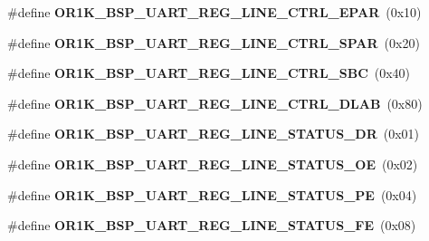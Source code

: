 \begin{DoxyCompactItemize}
\#define {\bfseries O\+R1\+K\+\_\+\+B\+S\+P\+\_\+\+U\+A\+R\+T\+\_\+\+R\+E\+G\+\_\+\+L\+I\+N\+E\+\_\+\+C\+T\+R\+L\+\_\+\+E\+P\+AR}~(0x10)
\item 
\mbox{\label{group__generic__or1k__reg_ga014665df73fa3c3c116e0972a6cc53fc}} 
\#define {\bfseries O\+R1\+K\+\_\+\+B\+S\+P\+\_\+\+U\+A\+R\+T\+\_\+\+R\+E\+G\+\_\+\+L\+I\+N\+E\+\_\+\+C\+T\+R\+L\+\_\+\+S\+P\+AR}~(0x20)
\item 
\mbox{\label{group__generic__or1k__reg_gae7a01f69b0ed842372858b2d42b120e1}} 
\#define {\bfseries O\+R1\+K\+\_\+\+B\+S\+P\+\_\+\+U\+A\+R\+T\+\_\+\+R\+E\+G\+\_\+\+L\+I\+N\+E\+\_\+\+C\+T\+R\+L\+\_\+\+S\+BC}~(0x40)
\item 
\mbox{\label{group__generic__or1k__reg_ga02b271c431301d49903aa676645ee95c}} 
\#define {\bfseries O\+R1\+K\+\_\+\+B\+S\+P\+\_\+\+U\+A\+R\+T\+\_\+\+R\+E\+G\+\_\+\+L\+I\+N\+E\+\_\+\+C\+T\+R\+L\+\_\+\+D\+L\+AB}~(0x80)
\item 
\mbox{\label{group__generic__or1k__reg_ga430537648e238f1a4fa4d15c63cda9a0}} 
\#define {\bfseries O\+R1\+K\+\_\+\+B\+S\+P\+\_\+\+U\+A\+R\+T\+\_\+\+R\+E\+G\+\_\+\+L\+I\+N\+E\+\_\+\+S\+T\+A\+T\+U\+S\+\_\+\+DR}~(0x01)
\item 
\mbox{\label{group__generic__or1k__reg_ga9cc85abbf04c1bdc96a43865c2a8017e}} 
\#define {\bfseries O\+R1\+K\+\_\+\+B\+S\+P\+\_\+\+U\+A\+R\+T\+\_\+\+R\+E\+G\+\_\+\+L\+I\+N\+E\+\_\+\+S\+T\+A\+T\+U\+S\+\_\+\+OE}~(0x02)
\item 
\mbox{\label{group__generic__or1k__reg_gaa62f8a046d40b43c9a10e5b8ba09f937}} 
\#define {\bfseries O\+R1\+K\+\_\+\+B\+S\+P\+\_\+\+U\+A\+R\+T\+\_\+\+R\+E\+G\+\_\+\+L\+I\+N\+E\+\_\+\+S\+T\+A\+T\+U\+S\+\_\+\+PE}~(0x04)
\item 
\mbox{\label{group__generic__or1k__reg_gac13fe2d80d7fbfb695ac6aca2b87a34a}} 
\#define {\bfseries O\+R1\+K\+\_\+\+B\+S\+P\+\_\+\+U\+A\+R\+T\+\_\+\+R\+E\+G\+\_\+\+L\+I\+N\+E\+\_\+\+S\+T\+A\+T\+U\+S\+\_\+\+FE}~(0x08)
\item 
\mbox{\label{group__generic__or1k__reg_gabd1e20c5b1734bac46b158b6cd7d5ba8}} 

\end{DoxyCompactItemize}
